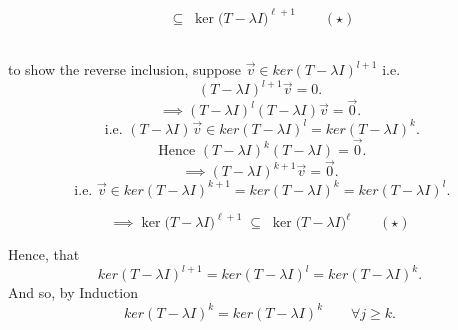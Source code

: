 \documentclass{report}
\begin{document}
{\begin{tcolorbox}[colframe=violet, boxrule=0.9pt, left=6pt, right=6pt,
                  top=4pt, bottom=4pt]
\[  \;\subseteq\;
  \ker\!\bigl(T-\lambda I\bigr)^{\ell+1}
  \qquad (\star)
\]
\end{tcolorbox}
\\ to show the reverse inclusion, suppose $ \vec{ v} \in ker   \left( T - \lambda I \right) ^{ l +1} $  i.e.  \\
 \[
 \left( T - \lambda I \right) ^{ l+1} \vec{ v} = 0
 .\] 
 \[
 \implies \left( T -  \lambda I \right) ^{l} \left( T - \lambda I \right)  \vec{ v} = \vec{ 0}  
 .\] 
 \[
 \text{ i.e. }    \left( T - \lambda I  \right) ^{ }  \vec{ v} \in ker \left( T -  \lambda I  \right) ^{l} = ker \left( T - \lambda I  \right) ^{k}
 .\] 
 \[
 \text{ Hence } \left( T - \lambda I \right) ^{k} \left( T - \lambda I \right) = \vec{ 0} 
 .\] 
 \[
 \implies \left( T - \lambda I  \right) ^{k+1} \vec{ v} = \vec{ 0}  
 .\] 
 \[
 \text{ i.e. } \vec{ v} \in ker \left( T - \lambda I \right) ^{k+1} = ker \left( T - \lambda I  \right) ^{k} = ker \left( T - \lambda I \right) ^{l}
 .\] 
  \begin{tcolorbox}[colframe=blue, boxrule=0.9pt, left=6pt, right=6pt,
                  top=4pt, bottom=4pt]
\[
 \implies \ker\!\bigl(T-\lambda I\bigr)^{\ell+1}
  \;\subseteq\;
  \ker\!\bigl(T-\lambda I\bigr)^{\ell}
  \qquad (\star)
\]
\end{tcolorbox}
Hence, \color{violet}{(\star)} \color{black}{ and} \color{blue}{(\star)} \color{black}{imply} that 
  \[
  ker \left(  T - \lambda I \right) ^{l+1} = ker \left(  T - \lambda I  \right) ^{l} = ker \left( T - \lambda I \right) ^{k}
  .\] 
  And so, by Induction
  \[
  ker \left( T - \lambda I  \right) ^{k} = ker \left(  T - \lambda I \right)  ^{k} \qquad  \forall  j \geq k  
  .\] 
}
\end{document}
